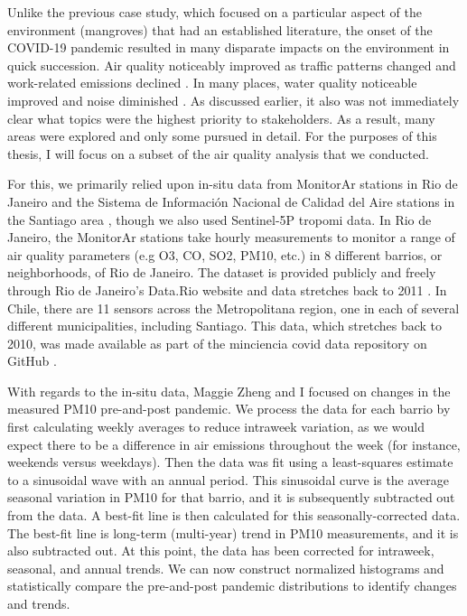 Unlike the previous case study, which focused on a particular aspect of the environment (mangroves) that had an established literature, the onset of the COVID-19 pandemic resulted in many disparate impacts on the environment in quick succession. Air quality noticeably improved as traffic patterns changed and work-related emissions declined \cite{isaifanDramaticImpactCoronavirus2020}. In many places, water quality noticeable improved and noise diminished \cite{aroraCoronavirusLockdownHelped2020}. As discussed earlier, it also was not immediately clear what topics were the highest priority to stakeholders. As a result, many areas were explored and only some pursued in detail. For the purposes of this thesis, I will focus on a subset of the air quality analysis that we conducted.

For this, we primarily relied upon in-situ data from MonitorAr stations in Rio de Janeiro  and the Sistema de Información Nacional de Calidad del Aire stations in the Santiago area , though we also used Sentinel-5P \ac{tropomi} data. In Rio de Janeiro, the MonitorAr stations take hourly measurements to monitor a range of air quality parameters (e.g O3, CO, SO2, PM10, etc.) in 8 different barrios, or neighborhoods, of Rio de Janeiro. The dataset is provided publicly and freely through Rio de Janeiro's Data.Rio website and data stretches back to 2011 \cite{institutopereirapassosDadosHorariosMonitoramento2018}. In Chile, there are  11 sensors across the Metropolitana region, one in each of several different municipalities, including Santiago. This data, which stretches back to 2010, was made available as part of the \ac{minciencia} \ac{covid} data repository on GitHub \cite{ministeriodecienciatecnologiaconocimientoeinnovacionDatosCOVID192021}.

With regards to the in-situ data, Maggie Zheng and I focused on changes in the measured PM10 pre-and-post pandemic. We process the data for each barrio by first calculating weekly averages to reduce intraweek variation, as we would expect there to be a difference in air emissions throughout the week (for instance, weekends versus weekdays). Then the data was fit using a least-squares estimate to a sinusoidal wave with an annual period. This sinusoidal curve is the average seasonal variation in PM10 for that barrio, and it is subsequently subtracted out from the data. A best-fit line is then calculated for this seasonally-corrected data. The best-fit line is long-term (multi-year) trend in PM10 measurements, and it is also subtracted out. At this point, the data has been corrected for intraweek, seasonal, and annual trends. We can now construct normalized histograms and statistically compare the pre-and-post pandemic distributions to identify changes and trends. 

